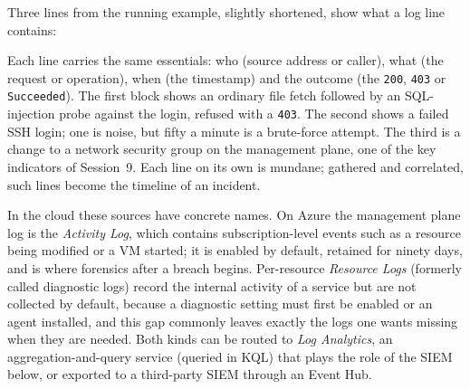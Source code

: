 Three lines from the running example, slightly shortened, show what a log
line contains:

\begin{center}
\end{center}

Each line carries the same essentials: who (source address or caller), what
(the request or operation), when (the timestamp) and the outcome (the
\texttt{200}, \texttt{403} or \texttt{Succeeded}). The first block shows an
ordinary file fetch followed by an SQL-injection probe against the login,
refused with a \texttt{403}. The second shows a failed SSH login; one is
noise, but fifty a minute is a brute-force attempt. The third is a change to
a network security group on the management plane, one of the key indicators
of Session~9. Each line on its own is mundane; gathered and correlated, such
lines become the timeline of an incident.

In the cloud these sources have concrete names. On Azure the management
plane log is the \emph{Activity Log}, which contains subscription-level
events such as a resource being modified or a VM started; it is enabled by
default, retained for ninety days, and is where forensics after a breach
begins. Per-resource \emph{Resource Logs} (formerly called diagnostic logs)
record the internal activity of a service but are not collected by default,
because a diagnostic setting must first be enabled or an agent installed,
and this gap commonly leaves exactly the logs one wants missing when they
are needed. Both kinds can be routed to \emph{Log Analytics}, an
aggregation-and-query service (queried in KQL) that plays the role of the
SIEM below, or exported to a third-party SIEM through an Event Hub.

